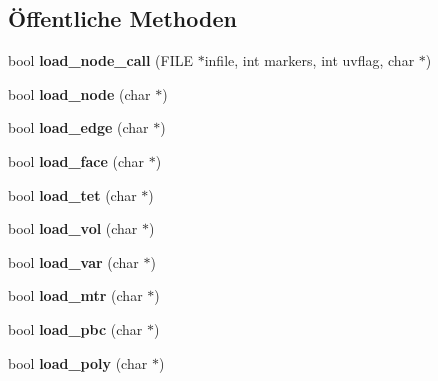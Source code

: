 \subsection*{Öffentliche Methoden}
\begin{DoxyCompactItemize}
\item 
\hypertarget{classtetgenio_a72c82390f2cf5cc8e82b7e78d3957d97}{bool {\bfseries load\-\_\-node\-\_\-call} (F\-I\-L\-E $\ast$infile, int markers, int uvflag, char $\ast$)}\label{classtetgenio_a72c82390f2cf5cc8e82b7e78d3957d97}

\item 
\hypertarget{classtetgenio_afeb93fe605c74f7523314fe21b726872}{bool {\bfseries load\-\_\-node} (char $\ast$)}\label{classtetgenio_afeb93fe605c74f7523314fe21b726872}

\item 
\hypertarget{classtetgenio_ae57d905901345797047108bc8995382a}{bool {\bfseries load\-\_\-edge} (char $\ast$)}\label{classtetgenio_ae57d905901345797047108bc8995382a}

\item 
\hypertarget{classtetgenio_acfd5a05583426d2d50c554e353814b22}{bool {\bfseries load\-\_\-face} (char $\ast$)}\label{classtetgenio_acfd5a05583426d2d50c554e353814b22}

\item 
\hypertarget{classtetgenio_afcb7616b65ca87657affbdad0c9dbe0b}{bool {\bfseries load\-\_\-tet} (char $\ast$)}\label{classtetgenio_afcb7616b65ca87657affbdad0c9dbe0b}

\item 
\hypertarget{classtetgenio_ad2c1a5e053689f1e68c0c849d3ebcd3d}{bool {\bfseries load\-\_\-vol} (char $\ast$)}\label{classtetgenio_ad2c1a5e053689f1e68c0c849d3ebcd3d}

\item 
\hypertarget{classtetgenio_a42b38e1e09d889f3027225402d888721}{bool {\bfseries load\-\_\-var} (char $\ast$)}\label{classtetgenio_a42b38e1e09d889f3027225402d888721}

\item 
\hypertarget{classtetgenio_a281d6699f746ac5d2b4ca70075be53c7}{bool {\bfseries load\-\_\-mtr} (char $\ast$)}\label{classtetgenio_a281d6699f746ac5d2b4ca70075be53c7}

\item 
\hypertarget{classtetgenio_a9c3559e0c61df8bb9d4ccff74af39cc0}{bool {\bfseries load\-\_\-pbc} (char $\ast$)}\label{classtetgenio_a9c3559e0c61df8bb9d4ccff74af39cc0}

\item 
\hypertarget{classtetgenio_a88658f64d725eb11ff33e7104e14561b}{bool {\bfseries load\-\_\-poly} (char $\ast$)}\label{classtetgenio_a88658f64d725eb11ff33e7104e14561b}


\end{DoxyCompactItemize}
